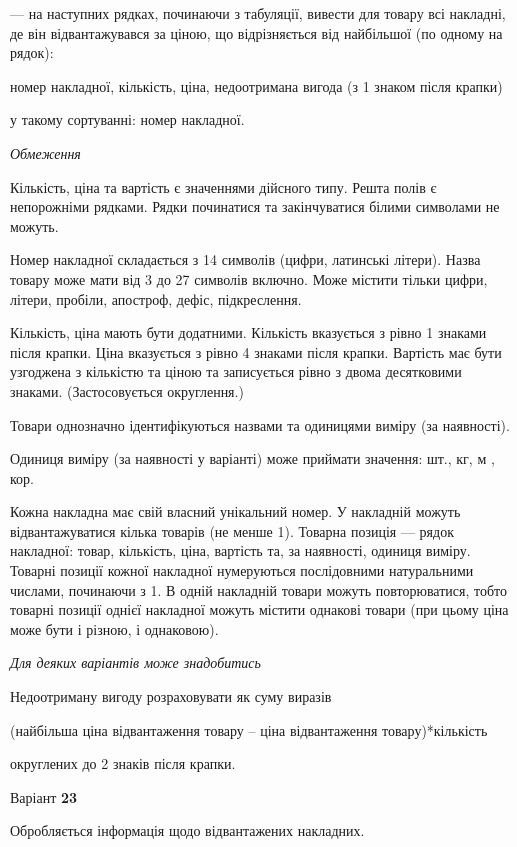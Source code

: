 \documentclass[11pt, ukrainian]{article}
\begin{document}
{\noindent}--- на наступних рядках, починаючи з табуляції, вивести для товару всі накладні, де він відвантажувався за ціною, що відрізняється від найбільшої (по одному на рядок):\par
номер накладної, кількість, ціна, недоотримана вигода (з 1 знаком після крапки)

{\noindent}у такому сортуванні: номер накладної.


\bigskip\textit{Обмеження}

Кількість, ціна та вартість є значеннями дійсного типу.
Решта полів є непорожніми рядками.
Рядки починатися та закінчуватися білими символами не можуть.

Номер накладної складається з 14 символів (цифри, латинські літери).
Назва товару може мати від 3 до 27 символів включно.
Може містити тільки цифри, літери, пробіли, апостроф, дефіс, підкреслення.

Кількість, ціна мають бути додатними.
Кількість вказується з рівно 1 знаками після крапки.
Ціна вказується з рівно 4 знаками після крапки.
Вартість має бути узгоджена з кількістю та ціною та записується рівно з двома десятковими знаками.
(Застосовується округлення.)

Товари однозначно ідентифікуються назвами та одиницями виміру (за наявності).

Одиниця виміру (за наявності у варіанті) може приймати значення: шт., кг, м , кор.

Кожна накладна має свій власний унікальний номер.
У накладній можуть відвантажуватися кілька товарів (не менше 1).
Товарна позиція --- рядок накладної: товар, кількість, ціна, вартість та, за наявності, одиниця виміру.
Товарні позиції кожної накладної нумеруються послідовними натуральними числами, починаючи з 1.
В одній накладній товари можуть повторюватися, 
тобто товарні позиції однієї накладної можуть містити однакові товари 
(при цьому ціна може бути і різною, і однаковою).

\bigskip\textit{Для деяких варіантів може знадобитись}

Недоотриману вигоду розраховувати як суму виразів
{\center (найбільша ціна відвантаження товару – ціна відвантаження товару)*кількість\par}

\bigskip
{\noindent} округлених до 2 знаків після крапки.


\par
\newpage
{\center Варіант  \No \textbf { 23 }\par}
\bigskip
Обробляється інформація щодо відвантажених накладних.
\end{document}
